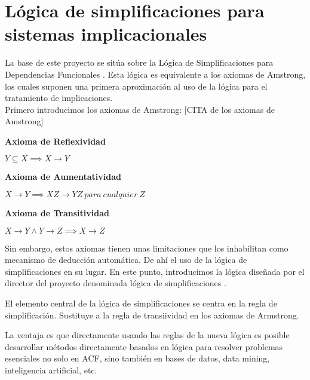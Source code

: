\section{L\'ogica de simplificaciones para sistemas implicacionales}


La base de este proyecto se sit\'ua sobre la L\'ogica de Simplificaciones para Dependencias Funcionales \cite{Cordero2002}. Esta l\'ogica es equivalente a los axiomas de Amstrong, los cuales suponen una primera aproximaci\'on al uso de la l\'ogica para el tratamiento de implicaciones.\\

Primero introducimos los axiomas de Amstrong: [CITA de los axiomas de Amstrong]

\textbf{Axioma de Reflexividad}

\begin{center}
    \(Y \subseteq X \implies X \to Y \)
\end{center}

\textbf{Axioma de Aumentatividad}

\begin{center}
    \(X \to Y \implies XZ \to YZ \ para \ cualquier \ Z \)
\end{center}

\textbf{Axioma de Transitividad}

\begin{center}
    \(X \to Y \wedge Y \to Z \implies X \to Z \)
\end{center}

Sin embargo, estos axiomas tienen unas limitaciones que los inhabilitan como mecanismo de deducci\'on autom\'atica. De ah\'i el uso de la l\'ogica de simplificaciones en su lugar. En este punto, introducimos la l\'ogica dise\~nada por el director del proyecto denominada l\'ogica de simplificaciones \cite{Cordero2002}.

El elemento central de la l\'ogica de simplificaciones se centra en la regla de simplificaci\'on. Sustituye a la regla de transiividad en los axiomas de Armstrong.

La ventaja es que directamente usando las reglas de la nueva l\'ogica es posible desarrollar m\'etodos directamente basados en l\'ogica para resolver problemas esenciales no solo en ACF, sino tambi\'en en bases de datos, data mining, inteligencia artificial, etc. 

